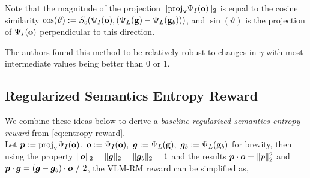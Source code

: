 Note that the magnitude of the projection \(\lVert\text{proj}_{\mathbf{v}}\Psi_I(\mathbf{o})\rVert_2\) is equal to the cosine similarity \(\cos(\vartheta) := S_c(\Psi_I(\mathbf{o}), (\Psi_L(\mathbf{g}) - \Psi_L(\mathbf{g}_b)))\), and \(\sin(\vartheta)\) is the projection of \(\Psi_I(\mathbf{o})\) perpendicular to this direction.

The authors found this method to be relatively robust to changes in \(\gamma\) with most intermediate values being better than \(0\) or \(1\).

\newpage
\subsection{Regularized Semantics Entropy Reward}
\label{sec:entropy-reward-reg}
We combine these ideas below to derive a \emph{baseline regularized semantics-entropy reward} from \eqref{eq:entropy-reward}.\\
Let \(\bm{p} := \text{proj}_{\mathbf{v}}\Psi_I(\mathbf{o})\), \(\bm{o} := \Psi_I(\mathbf{o}),\ \bm{g} := \Psi_L(\mathbf{g}),\ \bm{g}_b := \Psi_L(\mathbf{g}_b)\) for brevity, then using the property \(\lVert\bm{o}\rVert_2 = \lVert\bm{g}\rVert_2 = \lVert\bm{g}_b\rVert_2 = 1\) and the results \(\bm{p} \cdot \bm{o} = \lVert p\rVert^2_2\) and \(\bm{p} \cdot \bm{g} = (\bm{g} - \bm{g}_b) \cdot \bm{o}\ /\ 2\), the VLM-RM reward can be simplified as,
\vspace{-1.5pt}
